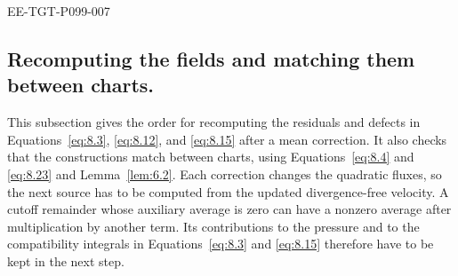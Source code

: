\begin{EESegment}{EE-TGT-P099-007}
\subsection{Recomputing the fields and matching them between charts.}\label{sec:8.7}
This subsection gives the order for recomputing the residuals and defects in
Equations~\eqref{eq:8.3}, \eqref{eq:8.12}, and \eqref{eq:8.15} after a mean correction. It also
checks that the constructions match between charts, using Equations~\eqref{eq:8.4} and
\eqref{eq:8.23} and Lemma~\ref{lem:6.2}. Each correction changes the quadratic fluxes, so the next
source has to be computed from the updated divergence-free velocity. A cutoff remainder whose
auxiliary average is zero can have a nonzero average after multiplication by another term. Its
contributions to the pressure and to the compatibility integrals in Equations~\eqref{eq:8.3} and
\eqref{eq:8.15} therefore have to be kept in the next step.
\end{EESegment}

